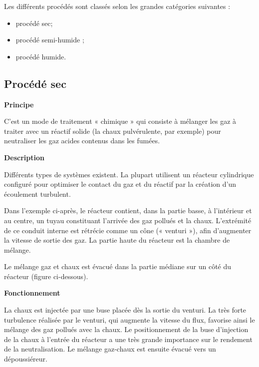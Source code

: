\vspace{0.3cm}
Les différents procédés sont classés selon les grandes catégories suivantes :
\begin{itemize}
  \item procédé sec;
  \item procédé semi-humide ;
  \item procédé humide.
\end{itemize}

\subsection{Procédé sec}
\textbf{Principe}
\vspace{0.3cm}

C’est un mode de traitement « chimique » qui consiste à mélanger les gaz à traiter avec un réactif solide (la chaux pulvérulente, par exemple) pour neutraliser les gaz acides contenus dans les fumées.

\vspace{0.3cm}
\textbf{Description}
\vspace{0.3cm}

Différents types de systèmes existent. La plupart utilisent un réacteur cylindrique configuré pour optimiser le contact du gaz et du réactif par la création d’un écoulement turbulent.
\vspace{0.3cm}

Dans l’exemple ci-après, le réacteur contient, dans la partie basse, à l’intérieur et au centre, un tuyau constituant l’arrivée des gaz pollués et la chaux.
L’extrémité de ce conduit interne est rétrécie comme un cône (« venturi »), afin d’augmenter la vitesse de sortie des gaz. La partie haute du réacteur est la chambre de mélange.
\vspace{0.3cm}

Le mélange gaz et chaux est évacué dans la partie médiane sur un côté du réacteur
(figure ci-dessous).

\vspace{0.3cm}
\textbf{Fonctionnement}
\vspace{0.3cm}

La chaux est injectée par une buse placée dès la sortie du venturi.
La très forte turbulence réalisée par le venturi, qui augmente la vitesse du flux, favorise ainsi le mélange des gaz pollués avec la chaux. Le positionnement de la buse d’injection de la chaux à l’entrée du réacteur a une très grande importance sur le rendement de la neutralisation. Le mélange gaz-chaux est ensuite évacué vers un dépoussiéreur.

